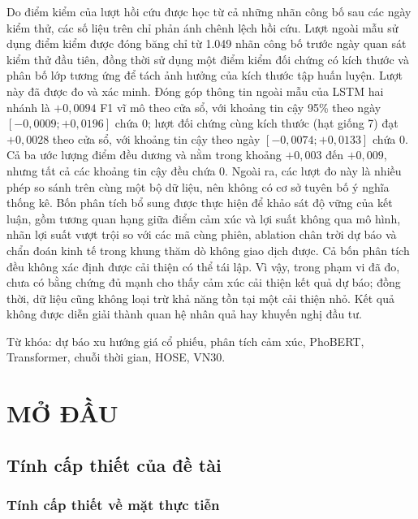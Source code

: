 \documentclass[12pt, a4paper, oneside]{report}
\begin{document}
Do điểm kiểm của lượt hồi cứu được học từ cả những nhãn công bố sau các ngày kiểm
thử, các số liệu trên chỉ phản ánh chênh lệch hồi cứu. Lượt ngoài mẫu sử dụng điểm kiểm
được đóng băng chỉ từ 1.049 nhãn công bố trước ngày quan sát kiểm thử đầu tiên, đồng thời
sử dụng một điểm kiểm đối chứng có kích thước và phân bố lớp tương ứng để tách ảnh hưởng
của kích thước tập huấn luyện. Lượt này đã được đo và xác minh. Đóng góp thông tin ngoài
mẫu của LSTM hai nhánh là $+0{,}0094$ F1 vĩ mô theo cửa sổ, với khoảng tin cậy 95\%
theo ngày $[-0{,}0009; +0{,}0196]$ chứa 0; lượt đối chứng cùng kích thước (hạt
giống 7) đạt $+0{,}0028$ theo cửa sổ, với khoảng tin cậy theo ngày $[-0{,}0074;
+0{,}0133]$ chứa 0. Cả ba ước lượng điểm đều dương và nằm trong khoảng
$+0{,}003$ đến $+0{,}009$, nhưng tất cả các khoảng tin cậy đều chứa 0. Ngoài ra, các lượt
đo này là nhiều phép so sánh trên cùng một bộ dữ liệu, nên không có cơ sở tuyên bố ý nghĩa thống kê. Bốn phân tích bổ sung được thực hiện để khảo sát
độ vững của kết luận, gồm tương quan hạng giữa điểm cảm xúc và lợi suất không qua
mô hình, nhãn lợi suất vượt trội so với các mã cùng phiên, ablation chân trời
dự báo và chẩn đoán kinh tế trong khung thăm dò không giao dịch được. Cả bốn phân tích
đều không xác định được cải thiện có thể tái lập. Vì vậy, trong phạm vi đã đo, chưa có
bằng chứng đủ mạnh cho thấy cảm xúc cải thiện kết quả dự báo; đồng thời, dữ liệu cũng
không loại trừ khả năng tồn tại một cải thiện nhỏ. Kết quả không được diễn giải
thành quan hệ nhân quả hay khuyến nghị đầu tư.

\vspace{0.5cm}
\noindent Từ khóa: dự báo xu hướng giá cổ phiếu, phân tích cảm xúc, PhoBERT,
Transformer, chuỗi thời gian, HOSE, VN30.


\chapter{MỞ ĐẦU}
\label{ch:mo-dau}
\section{Tính cấp thiết của đề tài}
\label{sec:ly-do}

\subsection{Tính cấp thiết về mặt thực tiễn}
\end{document}
